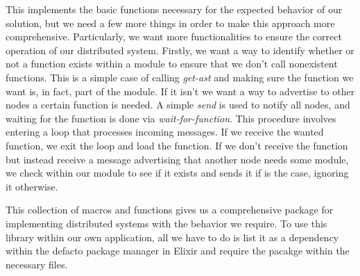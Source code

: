 This implements the basic functions necessary for the expected behavior of our solution, but we need a few more things in order to make this approach more comprehensive. Particularly, we want more functionalities to ensure the correct operation of our distributed system. Firstly, we want a way to identify whether or not a function exists within a module to ensure that we don't call nonexistent functions. This is a simple case of calling \textit{get-ast} and making sure the function we want is, in fact, part of the module. If it isn't we want a way to advertise to other nodes a certain function is needed. A simple \textit{send} is used to notify all nodes, and waiting for the function is done via \textit{wait-for-function}. This procedure involves entering a loop that processes incoming messages. If we receive the wanted function, we exit the loop and load the function. If we don't receive the function but instead receive a message advertising that another node needs some module, we check within our module to see if it exists and sends it if is the case, ignoring it otherwise. 

This collection of macros and functions gives us a comprehensive package for implementing distributed systems with the behavior we require. To use this library within our own application, all we have to do is list it as a dependency within the defacto package manager in Elixir and require the pacakge within the necessary files.